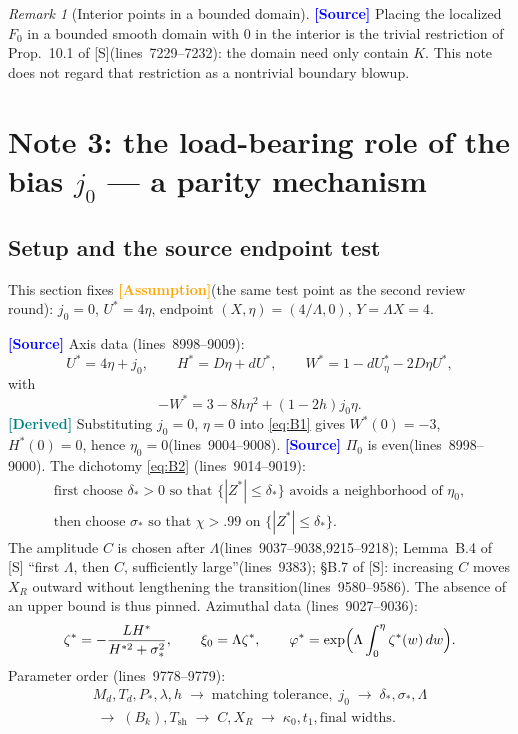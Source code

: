 \documentclass[11pt,a4paper]{article}
\theoremstyle{definition}
\theoremstyle{remark}
\newtheorem{remark}[theorem]{Remark}
\newcommand{\lnos}[1]{(lines~#1)}
\newcommand{\ORIG}{\textcolor{blue}{\textbf{[Source]}}}
\newcommand{\DER}{\textcolor{teal}{\textbf{[Derived]}}}
\newcommand{\HYP}{\textcolor{orange}{\textbf{[Assumption]}}}
\begin{document}
\begin{remark}[Interior points in a bounded domain]
\ORIG
Placing the localized $F_0$ in a bounded smooth domain with $0$ in the interior is the trivial
restriction of Prop.~10.1 of [S]\lnos{7229--7232}: the domain need only contain $K$.
This note does not regard that restriction as a nontrivial boundary blowup.
\end{remark}

\section{Note 3: the load-bearing role of the bias \texorpdfstring{$j_0$}{j\_0} --- a parity mechanism}
\label{sec:note3}

\subsection{Setup and the source endpoint test}
\label{sec:note3-setup}

This section fixes \HYP (the same test point as the second review round):
$j_0=0$, $U^*=4\eta$, endpoint $(X,\eta)=(4/\Lambda,0)$, $Y=\Lambda X=4$.

\ORIG
Axis data \lnos{8998--9009}:
\begin{equation}
\label{eq:B1}
U^*=4\eta+j_0,\qquad
H^*=D\eta+d U^*,\qquad
W^*=1-d U^*_\eta-2D\eta U^*,
\end{equation}
with
\[
-W^*=3-8h\eta^2+(1-2h)j_0\eta.
\]
\DER
Substituting $j_0=0$, $\eta=0$ into \eqref{eq:B1} gives $W^*(0)=-3$, $H^*(0)=0$, hence
$\eta_0=0$\lnos{9004--9008}.
\ORIG
$\Pi_0$ is even\lnos{8998--9000}. The dichotomy \eqref{eq:B2} \lnos{9014--9019}:
\begin{equation}
\label{eq:B2}
\begin{gathered}
\text{first choose }\delta_*>0\text{ so that }\{|Z^*|\le\delta_*\}\text{ avoids a neighborhood of }\eta_0,\\
\text{then choose }\sigma_*\text{ so that }\chi>.99\text{ on }\{|Z^*|\le\delta_*\}.
\end{gathered}
\end{equation}
The amplitude $C$ is chosen after $\Lambda$\lnos{9037--9038,9215--9218};
Lemma~B.4 of [S] ``first $\Lambda$, then $C$, sufficiently large''\lnos{9383};
\S B.7 of [S]: increasing $C$ moves $X_R$ outward without lengthening the transition\lnos{9580--9586}.
The absence of an upper bound is thus pinned.
Azimuthal data \lnos{9027--9036}:
\begin{equation}
\label{eq:B3}
\zeta^*=-\frac{L H^*}{H^{*2}+\sigma_*^2},\qquad
\xi_0=\Lambda\zeta^*,\qquad
\varphi^*=\exp\Bigl(\Lambda\int_0^\eta\zeta^*(w)\,dw\Bigr).
\end{equation}
Parameter order \lnos{9778--9779}:
\begin{equation}
\label{eq:B40}
\begin{gathered}
M_d,T_d,P_*,\lambda,h
\;\to\;
\text{matching tolerance},\; j_0
\;\to\;
\delta_*,\sigma_*,\Lambda\\
\;\to\;
(B_k),T_{\mathrm{sh}}
\;\to\;
C,X_R
\;\to\;
\kappa_0,t_1,\text{final widths}.
\end{gathered}
\end{equation}
\end{document}
